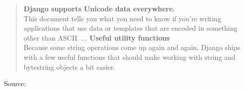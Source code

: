 \documentclass[Screen16to9,17pt]{foils}
\begin{document}

\begin{quote}
{\bf Django supports Unicode data everywhere.}\\

This document tells you what you need to know if you’re writing applications that use data or templates that are encoded in something other than ASCII.
...
{\bf Useful utility functions}\\
Because some string operations come up again and again, Django ships with a few useful functions that should make working with string and bytestring objects a bit easier.
\end{quote}


Source:\\






\slidenext{}
\end{document}
